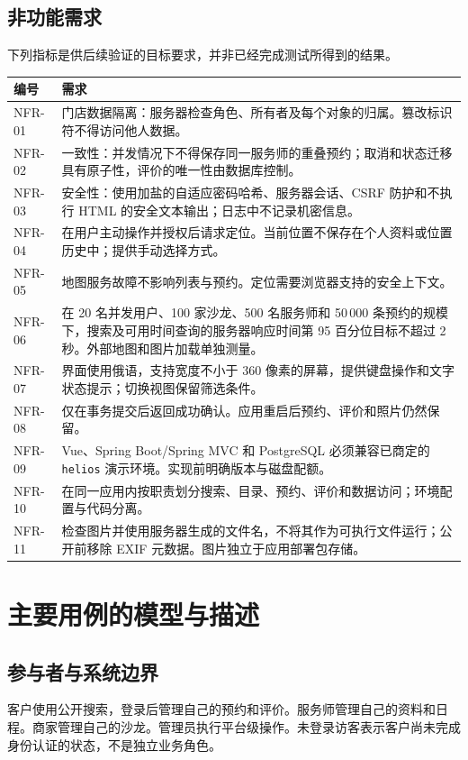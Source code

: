 \subsection{非功能需求}
下列指标是供后续验证的目标要求，并非已经完成测试所得到的结果。
\begin{longtable}{L{1.9cm}L{12.9cm}}
\toprule 编号 & 需求 \\ \midrule
\endhead
NFR-01 & 门店数据隔离：服务器检查角色、所有者及每个对象的归属。篡改标识符不得访问他人数据。 \\
NFR-02 & 一致性：并发情况下不得保存同一服务师的重叠预约；取消和状态迁移具有原子性，评价的唯一性由数据库控制。 \\
NFR-03 & 安全性：使用加盐的自适应密码哈希、服务器会话、CSRF 防护和不执行 HTML 的安全文本输出；日志中不记录机密信息。 \\
NFR-04 & 在用户主动操作并授权后请求定位。当前位置不保存在个人资料或位置历史中；提供手动选择方式。 \\
NFR-05 & 地图服务故障不影响列表与预约。定位需要浏览器支持的安全上下文。 \\
NFR-06 & 在 20 名并发用户、100 家沙龙、500 名服务师和 50\,000 条预约的规模下，搜索及可用时间查询的服务器响应时间第 95 百分位目标不超过 2 秒。外部地图和图片加载单独测量。 \\
NFR-07 & 界面使用俄语，支持宽度不小于 360 像素的屏幕，提供键盘操作和文字状态提示；切换视图保留筛选条件。 \\
NFR-08 & 仅在事务提交后返回成功确认。应用重启后预约、评价和照片仍然保留。 \\
NFR-09 & Vue、Spring Boot/Spring MVC 和 PostgreSQL 必须兼容已商定的 \texttt{helios} 演示环境。实现前明确版本与磁盘配额。 \\
NFR-10 & 在同一应用内按职责划分搜索、目录、预约、评价和数据访问；环境配置与代码分离。 \\
NFR-11 & 检查图片并使用服务器生成的文件名，不将其作为可执行文件运行；公开前移除 EXIF 元数据。图片独立于应用部署包存储。 \\
\bottomrule
\end{longtable}

\section{主要用例的模型与描述}
\subsection{参与者与系统边界}
客户使用公开搜索，登录后管理自己的预约和评价。服务师管理自己的资料和日程。商家管理自己的沙龙。管理员执行平台级操作。未登录访客表示客户尚未完成身份认证的状态，不是独立业务角色。


